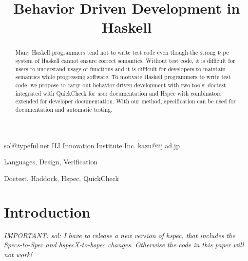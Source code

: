 \documentclass[preprint]{sigplanconf}
\begin{document}
\copyrightdata{[to be supplied]}


\title{Behavior Driven Development in Haskell}

           {}
           {sol@typeful.net}
           {IIJ Innovation Institute Inc.}
           {kazu@iij.ad.jp}

\maketitle

\begin{abstract}

Many Haskell programmers tend not to write test code even though the
strong type system of Haskell cannot ensure correct semantics.
Without test code, it is difficult for users to understand usage of
functions and it is difficult for developers to maintain semantics
while progressing software. To motivate Haskell programmers to write
test code, we propose to carry out behavior driven development with
two tools: doctest integrated with QuickCheck for user documentation
and Hspec with combinators extended for developer documentation. With
our method, specification can be used for documentation and automatic
testing.


\end{abstract}


\terms Languages, Design, Verification

\keywords Doctest, Haddock, Hspec, QuickCheck

\section{Introduction}

\emph{IMPORTANT: sol: I have to release a new version of hspec, that
includes the Specs-to-Spec and hspecX-to-hspec changes.  Otherwise the
code in this paper will not work!}
\end{document}

